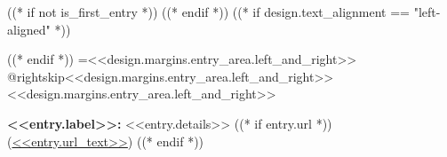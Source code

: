 ((* if not is_first_entry *))
\vspace{<<design.margins.entry_area.vertical_between>>}
((* endif *))
\begingroup((* if design.text_alignment == "left-aligned" *))\raggedright((* endif *))
\leftskip=<<design.margins.entry_area.left_and_right>>
\advance\csname @rightskip\endcsname <<design.margins.entry_area.left_and_right>>
\advance\rightskip <<design.margins.entry_area.left_and_right>>

\textbf{<<entry.label>>:} <<entry.details>> ((* if entry.url *)) (\href{<<entry.url>>}{<<entry.url_text>>}) ((* endif *))
\par\endgroup